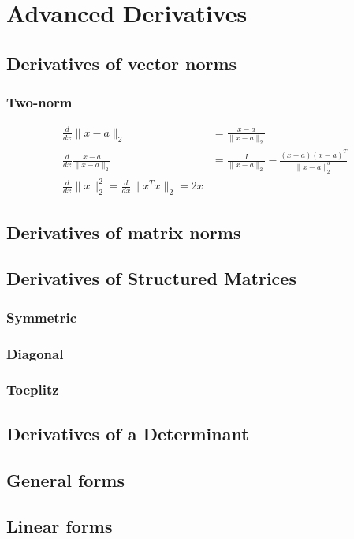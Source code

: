 
\chapter{Advanced Derivatives}

\section{Derivatives of vector norms}

\subsection{Two-norm}
\begin{align}
   \frac{d}{dx}\|x-a\|_2 &= \frac{x-a}{\|x-a\|_2}
   \\
   \frac{d}{dx}\frac{x-a}{\|x-a\|_2} &= \frac{I}{\|x-a\|_2} - \frac{(x-a)(x-a)^T}{\|x-a\|_2^3}
   \\
   \frac{d}{dx}\|x\|_2^2 = \frac{d}{dx}\|x^T x\|_2 = 2x
\end{align}

\section{Derivatives of matrix norms}

\section{Derivatives of Structured Matrices}

\subsection{Symmetric}
\subsection{Diagonal}
\subsection{Toeplitz}

\section{Derivatives of a Determinant}
\section{General forms}
\section{Linear forms}
